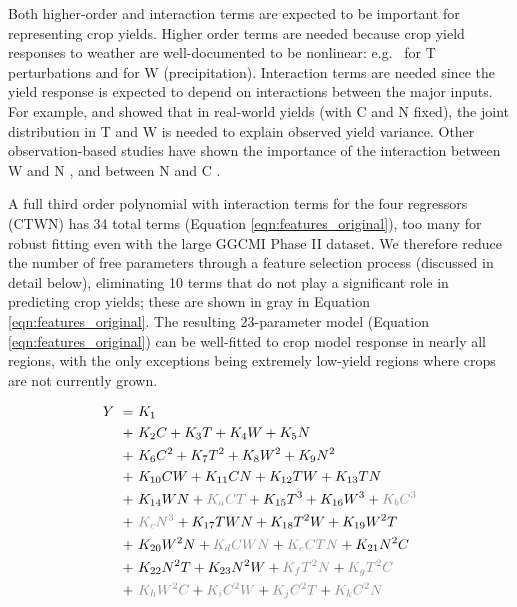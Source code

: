 \documentclass[gmd, manuscript]{copernicus} %
\begin{document}
Both higher-order and interaction terms are expected to be important for representing crop yields. Higher order terms are needed because crop yield responses to weather are well-documented to be nonlinear: e.g.\ \citet{Schlenker2009} for T perturbations and \citet{He2016} for W (precipitation). 
Interaction terms are needed since the yield response is expected to depend on interactions between the major inputs. 
For example, \citet{Lobell2007} and \citet{Tebaldi2008} showed that in real-world yields (with C and N fixed), the joint distribution in T and W is needed to explain observed yield variance.  
Other observation-based studies have shown the importance of the interaction between W and N \citep[e.g.][]{AULAKH2005}, and between N and C \citep{Mitsuru92, Nakamura97}. 

A full third order polynomial with interaction terms for the four regressors (CTWN) has 34 total terms (Equation \ref{eqn:features_original}), too many for robust fitting even with the large GGCMI Phase II dataset. 
We therefore reduce the number of free parameters through a feature selection process (discussed in detail below), eliminating 10 terms that do not play a significant role in predicting crop yields; these are shown in {\color{dark-gray}gray} in Equation \ref{eqn:features_original}. 
The resulting 23-parameter model (Equation \ref{eqn:features_original}) can be well-fitted to crop model response in nearly all regions, with the only exceptions being extremely low-yield regions where crops are not currently grown.

\begin{align}
    \label{eqn:features_original}
    Y\ = \ & K_{1}  \\
    + \ & K_{2} C     + K_{3} T      + K_{4} W      + K_{5} N   \nonumber \\
    + \ & K_{6} C^2   + K_{7} T^2    + K_{8} W^2    + K_{9} N^2 \nonumber \\
    + \ & K_{10} C W  + K_{11} C N   + K_{12} T W   + K_{13} T N \nonumber \\
    + \ & K_{14} W N  +{\color{dark-gray}K_{a} C T} + K_{15} T^3  + K_{16} W^3  + {\color{dark-gray}K_{b} C^3} \nonumber \\
    + \ & {\color{dark-gray}K_{c} N^3} + K_{17} T W N + K_{18} T^2 W + K_{19} W^2 T \nonumber \\
    + \ & K_{20} W^2 N + {\color{dark-gray}K_{d} C W N} + {\color{dark-gray}K_{e} C T N} + K_{21} N^2 C \nonumber \\
    + \ & K_{22} N^2 T + K_{23} N^2 W + {\color{dark-gray}K_{f} T^2 N} + {\color{dark-gray}K_{g} T^2 C}  \nonumber \\
    + \ & {\color{dark-gray}K_{h} W^2 C} + {\color{dark-gray}K_{i} C^2 W} + {\color{dark-gray}K_{j} C^2 T} + {\color{dark-gray}K_{k} C^2 N} \nonumber
\end{align}
\end{document}
